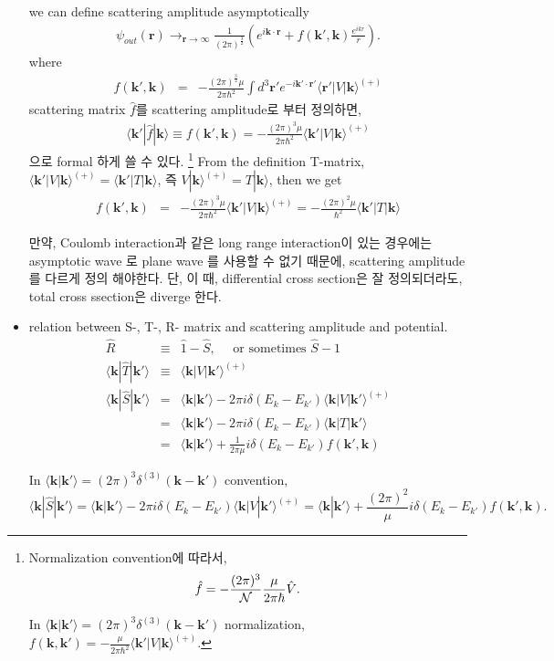 \documentclass[10pt]{book}
\def\bm{\boldsymbol}
\newcommand{\bea}{\begin{eqnarray}}
\newcommand{\eea}{\end{eqnarray}}
\newcommand{\no}{\nonumber \\}
\def\vk{{\bm k}}
\def\vr{{\bm r}}
\def\la{\langle}
\def\ra{\rangle}
\begin{document}
\begin{itemize}
we can define scattering amplitude asymptotically
\bea
\boxed{
\psi_{out}(\vr)\to_{\vr\to \infty} \frac{1}{(2\pi)^{\frac{3}{2}}}
     \left(e^{i\vk\cdot\vr}+f(\vk',\vk)\frac{e^{ikr}}{r}\right).}
\eea
where
\bea
f(\vk',\vk)&=&-\frac{(2\pi)^{\frac{3}{2}}\mu}{2\pi\hbar^2} 
                    \int d^3\vr' e^{-i\vk'\cdot\vr'}
                    \la \vr'|V|\vk\ra^{(+)}
\eea
scattering matrix $\hat{f}$를 scattering amplitude로 부터 정의하면,
\bea
\boxed{
\la \vk'|\hat{f}|\vk\ra\equiv f(\vk',\vk)
=-\frac{(2\pi)^3\mu}{2\pi\hbar^2}\la \vk'|V|\vk\ra^{(+)}
}
\eea
으로 formal 하게 쓸 수 있다.
\footnote{ Normalization convention에 따라서,
\bea 
\hat{f}=-\frac{(2\pi)^3}{\cal N}\frac{\mu}{2\pi\hbar}\hat{V}.
\eea 
 
In  $\la \vk|\vk'\ra=(2\pi)^3\delta^{(3)}(\vk-\vk')$
normalization, $f(\vk,\vk')=-\frac{\mu}{2\pi\hbar^2}\la \vk'|V|\vk\ra^{(+)}$.
}
From the definition T-matrix, 
$\la \vk'|V|\vk\ra^{(+)}=\la \vk' |T|\vk\ra $,
즉 $V|\vk\ra^{(+)}=T|\vk\ra$, 
then we get
\bea
f(\vk',\vk) &=&-\frac{(2\pi)^3\mu}{2\pi\hbar^2}\la\vk'|V|\vk\ra^{(+)}
            =-\frac{(2\pi)^2\mu}{\hbar^2}\la\vk'|T|\vk\ra
\eea


만약, Coulomb interaction과 같은 long range interaction이 있는 경우에는 
asymptotic wave 로 plane wave 를 사용할 수 없기 때문에,
scattering amplitude를 다르게 정의 해야한다. 단, 이 때, differential cross section은 잘 정의되더라도, 
total cross ssection은 diverge 한다.


\item relation between S-, T-, R- matrix and scattering amplitude
and potential.
\bea
\hat{R}& \equiv& \hat{1}-\hat{S} ,\quad \mbox{ or sometimes } \hat{S}-1\no
\la \vk|\hat{T}|\vk'\ra &\equiv& \la \vk|V|\vk'\ra^{(+)} \no
\la \vk|\hat{S}|\vk'\ra
&=&\la \vk|\vk'\ra-2\pi i\delta(E_k-E_{k'})\la \vk|V|\vk'\ra^{(+)}
\no
&=&\la \vk|\vk'\ra-2\pi i\delta(E_k-E_{k'})\la \vk|T|\vk'\ra \no
&=&\la \vk|\vk'\ra
   +\frac{1}{2\pi\mu} i\delta(E_k-E_{k'}) f(\vk',\vk)
\eea

In $\la \vk|\vk'\ra=(2\pi)^3\delta^{(3)}(\vk-\vk')$
convention,
$$\la \vk|\hat{S}|\vk'\ra
=\la \vk|\vk'\ra-2\pi i\delta(E_k-E_{k'})\la \vk|V|\vk'\ra^{(+)}
=\la \vk|\vk'\ra+\frac{(2\pi)^2}{\mu} i\delta(E_k-E_{k'})
  f(\vk',\vk).$$


\end{itemize}
\end{document}
